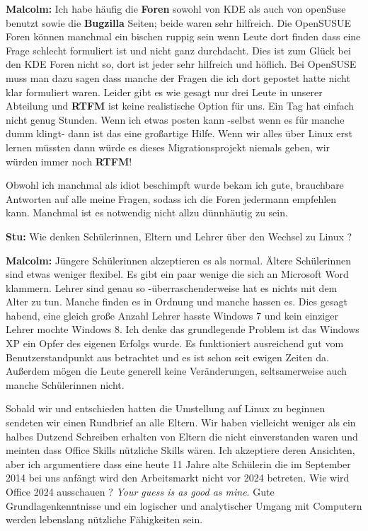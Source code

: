 \documentclass[10pt,a4paper,ngerman,twoside]{article} %
\begin{document}
\begin{multicols}{3}
\textbf{Malcolm:} Ich habe häufig die \textbf{Foren} sowohl von KDE als auch von openSuse benutzt sowie die \textbf{Bugzilla} Seiten; beide waren sehr hilfreich. Die OpenSUSUE Foren können manchmal ein bischen ruppig sein wenn Leute dort finden dass eine Frage schlecht formuliert ist und nicht ganz durchdacht. Dies ist zum Glück bei den KDE Foren nicht so, dort ist jeder sehr hilfreich und höflich. Bei OpenSUSE muss man dazu sagen dass manche der Fragen die ich dort gepostet hatte nicht klar formuliert waren. Leider gibt es wie gesagt nur drei Leute in unserer Abteilung und \textbf{RTFM} ist keine realistische Option für uns. Ein Tag hat einfach nicht genug Stunden. Wenn ich etwas posten kann -selbst wenn es für manche dumm klingt- dann ist das eine großartige Hilfe. Wenn wir alles über Linux erst lernen müssten dann würde es dieses Migrationsprojekt niemals geben, wir würden immer noch \textbf{RTFM}!

Obwohl ich manchmal als idiot beschimpft wurde bekam ich gute, brauchbare Antworten auf alle meine Fragen, sodass ich die Foren jedermann empfehlen kann. Manchmal ist es notwendig nicht allzu dünnhäutig zu sein.

\textbf{Stu:} Wie denken Schülerinnen, Eltern und Lehrer über den Wechsel zu Linux ?


\textbf{Malcolm:} Jüngere Schülerinnen akzeptieren es als normal. Ältere Schülerinnen sind etwas weniger flexibel. Es gibt ein paar wenige die sich an Microsoft Word klammern. Lehrer sind genau so -überraschenderweise hat es nichts mit dem Alter zu tun. Manche finden es in Ordnung und manche hassen es. Dies gesagt habend, eine gleich große Anzahl Lehrer hasste Windows 7 und kein einziger Lehrer mochte Windows 8. Ich denke das grundlegende Problem ist das Windows XP ein Opfer des eigenen Erfolgs wurde. Es funktioniert ausreichend gut vom Benutzerstandpunkt aus betrachtet und es ist schon seit ewigen Zeiten da. Außerdem mögen die Leute generell keine Veränderungen, seltsamerweise auch manche Schülerinnen nicht. 

Sobald wir und entschieden hatten die Umstellung auf Linux zu beginnen sendeten wir einen Rundbrief an alle Eltern. Wir haben vielleicht weniger als ein halbes Dutzend Schreiben erhalten von Eltern die nicht einverstanden waren und meinten dass Office Skills nützliche Skills wären. Ich akzeptiere deren Ansichten, aber ich argumentiere dass eine heute 11 Jahre alte Schülerin die im September 2014 bei uns anfängt wird den Arbeitsmarkt nicht vor 2024 betreten. Wie wird Office 2024 ausschauen ? \emph{Your guess is as good as mine}. Gute Grundlagenkenntnisse und ein logischer und analytischer Umgang mit Computern werden lebenslang nützliche Fähigkeiten sein.


\end{multicols}
\end{document}
